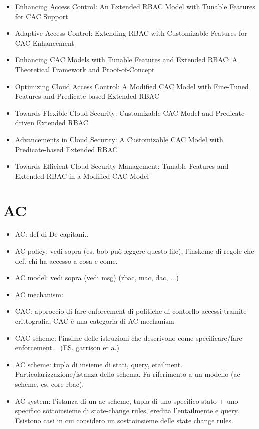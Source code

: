 \begin{itemize}
    \item Enhancing Access Control: An Extended RBAC Model with Tunable Features for CAC Support
    \item Adaptive Access Control: Extending RBAC with Customizable Features for CAC Enhancement
    \item Enhancing CAC Models with Tunable Features and Extended RBAC: A Theoretical Framework and Proof-of-Concept
    \item Optimizing Cloud Access Control: A Modified CAC Model with Fine-Tuned Features and Predicate-based Extended RBAC
    \item Towards Flexible Cloud Security: Customizable CAC Model and Predicate-driven Extended RBAC
    \item Advancements in Cloud Security: A Customizable CAC Model with Predicate-based Extended RBAC
    \item Towards Efficient Cloud Security Management: Tunable Features and Extended RBAC in a Modified CAC Model
\end{itemize}

\section{AC}

\begin{itemize}
    \item AC: def di De capitani..
    \item AC policy: vedi sopra (es. bob può leggere questo file), l'inskeme di regole che def. chi ha accesso a cosa e come.
    \item AC model: vedi sopra (vedi msg) (rbac, mac, dac, ...)
    \item AC mechanism: 
    \item CAC: approccio di fare enforcement di politiche di contorllo accessi tramite crittografia, CAC è una categoria di AC mechanism
    \item CAC scheme: l'insime delle istruzioni che descrivono come specificare/fare enforcement... (ES. garrison et a.)
    \item AC scheme: tupla di insieme di stati, query, etailment. Particolarizzazione/istanza dello schema. Fa riferimento a un modello (ac scheme, es. core rbac).
    \item AC system: l'istanza di un ac scheme, tupla di uno specifico stato + uno specifico sottoinsieme di state-change rules, eredita l'entailmente e query. Esistono casi in cui considero un sosttoinsieme delle state change rules.
\end{itemize}



